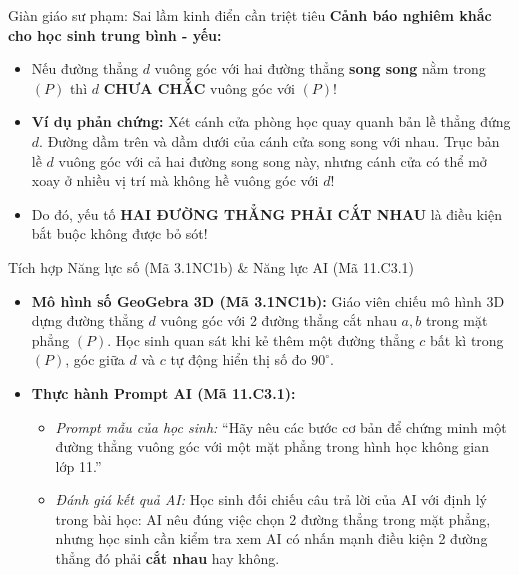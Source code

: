 \documentclass[12pt, a4paper]{article}
\begin{document}
\begin{scaffoldbox}{Giàn giáo sư phạm: Sai lầm kinh điển cần triệt tiêu}
\textbf{Cảnh báo nghiêm khắc cho học sinh trung bình - yếu:}
\begin{itemize}
    \item Nếu đường thẳng $d$ vuông góc với hai đường thẳng \textbf{song song} nằm trong $(P)$ thì $d$ \textbf{CHƯA CHẮC} vuông góc với $(P)$!
    \item \textbf{Ví dụ phản chứng:} Xét cánh cửa phòng học quay quanh bản lề thẳng đứng $d$. Đường dầm trên và dầm dưới của cánh cửa song song với nhau. Trục bản lề $d$ vuông góc với cả hai đường song song này, nhưng cánh cửa có thể mở xoay ở nhiều vị trí mà không hề vuông góc với $d$!
    \item Do đó, yếu tố \textbf{HAI ĐƯỜNG THẲNG PHẢI CẮT NHAU} là điều kiện bắt buộc không được bỏ sót!
\end{itemize}
\end{scaffoldbox}

\begin{aibox}{Tích hợp Năng lực số (Mã 3.1NC1b) \& Năng lực AI (Mã 11.C3.1)}
\begin{itemize}[leftmargin=0.6cm]
    \item \textbf{Mô hình số GeoGebra 3D (Mã 3.1NC1b):} Giáo viên chiếu mô hình 3D dựng đường thẳng $d$ vuông góc với 2 đường thẳng cắt nhau $a, b$ trong mặt phẳng $(P)$. Học sinh quan sát khi kẻ thêm một đường thẳng $c$ bất kì trong $(P)$, góc giữa $d$ và $c$ tự động hiển thị số đo $90^\circ$.
    \item \textbf{Thực hành Prompt AI (Mã 11.C3.1):}
    \begin{itemize}
        \item \textit{Prompt mẫu của học sinh:} ``Hãy nêu các bước cơ bản để chứng minh một đường thẳng vuông góc với một mặt phẳng trong hình học không gian lớp 11.''
        \item \textit{Đánh giá kết quả AI:} Học sinh đối chiếu câu trả lời của AI với định lý trong bài học: AI nêu đúng việc chọn 2 đường thẳng trong mặt phẳng, nhưng học sinh cần kiểm tra xem AI có nhấn mạnh điều kiện 2 đường thẳng đó phải \textbf{cắt nhau} hay không.
    \end{itemize}
\end{itemize}
\end{aibox}
\end{document}
